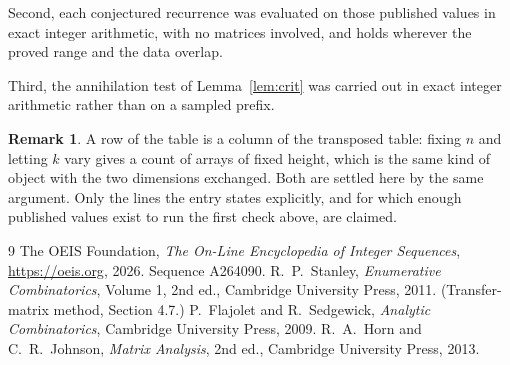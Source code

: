 \documentclass[11pt,a4paper]{article}
\theoremstyle{plain}
\theoremstyle{definition}
\newtheorem{remark}[theorem]{Remark}
\begin{document}
Second, each conjectured recurrence was evaluated on those published values in exact
integer arithmetic, with no matrices involved, and holds wherever the proved range and the
data overlap.

Third, the annihilation test of Lemma~\ref{lem:crit} was carried out in exact integer
arithmetic rather than on a sampled prefix.

\begin{remark}
A row of the table is a column of the transposed table: fixing $n$ and letting $k$ vary gives a
count of arrays of fixed height, which is the same kind of object with the two dimensions
exchanged. Both are settled here by the same argument. Only the lines the entry states
explicitly, and for which enough published values exist to run the first check above, are
claimed.
\end{remark}

\begin{thebibliography}{9}
 The OEIS Foundation, \emph{The On-Line Encyclopedia of Integer
Sequences}, \url{https://oeis.org}, 2026. Sequence A264090.
 R.~P.~Stanley, \emph{Enumerative Combinatorics}, Volume 1, 2nd ed.,
Cambridge University Press, 2011. (Transfer-matrix method, Section 4.7.)
 P.~Flajolet and R.~Sedgewick, \emph{Analytic Combinatorics}, Cambridge
University Press, 2009.
 R.~A.~Horn and C.~R.~Johnson, \emph{Matrix Analysis}, 2nd ed., Cambridge
University Press, 2013.
\end{thebibliography}
\end{document}
